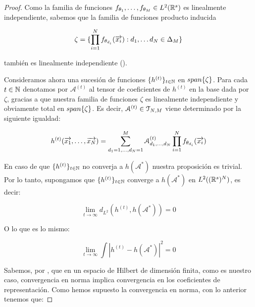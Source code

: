 \begin{proof}
    Como la familia de funciones $f_{\theta_1}, \ldots, f_{\theta_M} \in L^2(\mathbb{R}^s)$ es linealmente independiente, sabemos que la familia de funciones producto inducida

    \begin{equation}
        \zeta = \{ \prod_{i = 1}^N f_{\theta_{d_i}}(\overrightarrow{x_i}): d_1, \ldots d_N \in \Delta_{M} \}
    \end{equation}

    también es linealmente independiente ().

    Consideramos ahora una sucesión de funciones $\{ h^{(t)} \}_{t \in \mathbb{N}}$ en $span\{ \zeta \}$. Para cada $t \in \mathbb{N}$ denotamos por $\mathcal{A}^{(t)}$ al tensor de coeficientes de $h^{(t)}$ en la base dada por $\zeta$, gracias a que nuestra familia de funciones $\zeta$ es linealmente independiente y obviamente total en $span \{ \zeta \}$. Es decir, $\mathcal{A}^{(t)} \in \mathcal{T}_{N, M}$ viene determinado por la siguiente igualdad:

    \begin{equation}
        h^{(t)}(\overrightarrow{x_1}, \ldots, \overrightarrow{x_N}) = \sum_{d_1 = 1, \ldots, d_N = 1}^M \mathcal{A}^{(t)}_{d_1, \ldots, d_N} \prod_{i = 1}^N f_{\theta_{d_i}}(\overrightarrow{x_i})
    \end{equation}

    En caso de que $\{ h^{(t)} \}_{t \in \mathbb{N}}$ no converja a $h(\mathcal{A}^*)$ nuestra proposición es trivial. Por lo tanto, supongamos que $\{ h^{(t)} \}_{t \in \mathbb{N}}$ converge a $h(\mathcal{A}^*)$ en $L^2((\mathbb{R}^s)^N)$, es decir:

    \begin{equation}
        \lim_{t \to \infty} d_{L^2}(h^{(t)}, h(\mathcal{A}^*)) = 0
    \end{equation}

    O lo que es lo mismo:

    \begin{equation}
        \lim_{t \to \infty} \int | h^{(t)} - h(\mathcal{A}^*)|^2 = 0
    \end{equation}

    Sabemos, por , que en un espacio de Hilbert de dimensión finita, como es nuestro caso, convergencia en norma implica convergencia en los coeficientes de representación. Como hemos supuesto la convergencia en norma, con lo anterior tenemos que:


\end{proof}
